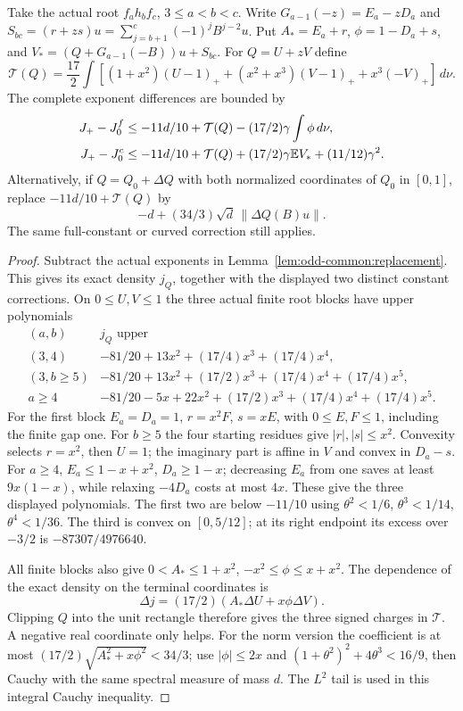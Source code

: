 \begin{lemma}
\label{lem:odd-complete:positive}
Take the actual root $f_a h_b f_c$, $3\le a<b<c$.
Write $G_{a-1}(-z)=E_a-zD_a$ and
$S_{bc}=(r+zs)u=\sum_{j=b+1}^{c}(-1)^jB^{j-2}u$.
Put $A_*=E_a+r$, $\phi=1-D_a+s$, and
$V_*=(Q+G_{a-1}(-B))u+S_{bc}$.
For $Q=U+zV$ define
\[
 \mathcal T(Q)=\frac{17}{2}\int
 [(1+x^2)(U-1)_+ +(x^2+x^3)(V-1)_+ +x^3(-V)_+]\,d\nu.
\]
The complete exponent differences are bounded by
\begin{align}
 J_+-J_0^f&\le-11d/10+\mathcal T(Q)
                 -(17/2)\gamma\int\phi\,d\nu,
       \label{eq:odd-complete:positive-full}\\
 J_+-J_0^c&\le-11d/10+\mathcal T(Q)
                 +(17/2)\gamma\mathbb E V_*+(11/12)\gamma^2.
       \label{eq:odd-complete:positive-curved}
\end{align}
Alternatively, if $Q=Q_0+\Delta Q$ with both normalized coordinates
of $Q_0$ in $[0,1]$, replace $-11d/10+\mathcal T(Q)$ by
\begin{equation}\label{eq:odd-complete:positive-norm}
 -d+(34/3)\sqrt d\,\|\Delta Q(B)u\|.
\end{equation}
The same full-constant or curved correction still applies.
\end{lemma}
\begin{proof}
Subtract the actual exponents in
Lemma~\ref{lem:odd-common:replacement}. This gives its exact density
$j_Q$, together with the displayed two distinct constant corrections.
On $0\le U,V\le1$ the three actual finite root blocks have upper
polynomials
\[
\begin{array}{c|l}
 (a,b)&j_Q\text{ upper}\\\hline
 (3,4)&-81/20+13x^2+(17/4)x^3+(17/4)x^4,\\
 (3,b\ge5)&-81/20+13x^2+(17/2)x^3+(17/4)x^4+(17/4)x^5,\\
 a\ge4&-81/20-5x+22x^2+(17/2)x^3+(17/4)x^4+(17/4)x^5.
\end{array}
\]
For the first block $E_a=D_a=1$, $r=x^2F$, $s=xE$,
with $0\le E,F\le1$, including the finite gap one.
For $b\ge5$ the four starting residues give $|r|,|s|\le x^2$.
Convexity selects $r=x^2$, then $U=1$; the imaginary part is
affine in $V$ and convex in $D_a-s$.
For $a\ge4$, $E_a\le1-x+x^2$, $D_a\ge1-x$; decreasing $E_a$
from one saves at least $9x(1-x)$, while relaxing $-4D_a$ costs
at most $4x$. These give the three displayed polynomials.
The first two are below $-11/10$ using
$\theta^2<1/6$, $\theta^3<1/14$, $\theta^4<1/36$.
The third is convex on $[0,5/12]$; at its right endpoint its
excess over $-3/2$ is $-87307/4976640$.

All finite blocks also give
$0<A_*\le1+x^2$, $-x^2\le\phi\le x+x^2$.
The dependence of the exact density on the terminal coordinates is
\[
 \Delta j=(17/2)(A_*\Delta U+x\phi\Delta V).
\]
Clipping $Q$ into the unit rectangle therefore gives the three
signed charges in $\mathcal T$. A negative real coordinate only
helps. For the norm version the coefficient is at most
$(17/2)\sqrt{A_*^2+x\phi^2}<34/3$; use $|\phi|\le2x$ and
$(1+\theta^2)^2+4\theta^3<16/9$, then Cauchy with the same
spectral measure of mass $d$. The $L^2$ tail is used in this
integral Cauchy inequality.
\end{proof}


